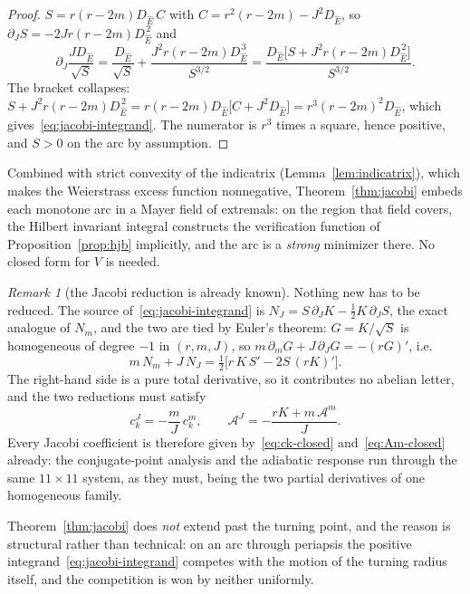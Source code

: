 \documentclass[12pt]{iopart}
\newcommand{\Ehat}{\hat E}
\theoremstyle{plain}
\theoremstyle{definition}
\theoremstyle{plain}
\theoremstyle{remark}
\newtheorem*{remark}{Remark}
\begin{document}
\begin{proof}
$S=r(r-2m)D_{\Ehat}\,C$ with $C=r^2(r-2m)-J^2D_{\Ehat}$, so
$\partial_JS=-2Jr(r-2m)D_{\Ehat}^{\,2}$ and
\[
   \partial_J\frac{JD_{\Ehat}}{\sqrt S}
   =\frac{D_{\Ehat}}{\sqrt S}+\frac{J^2r(r-2m)D_{\Ehat}^{\,3}}{S^{3/2}}
   =\frac{D_{\Ehat}\big[S+J^2r(r-2m)D_{\Ehat}^{\,2}\big]}{S^{3/2}} .
\]
The bracket collapses: $S+J^2r(r-2m)D_{\Ehat}^{\,2}
=r(r-2m)D_{\Ehat}\big[C+J^2D_{\Ehat}\big]=r^3(r-2m)^2D_{\Ehat}$, which
gives~\eqref{eq:jacobi-integrand}. The numerator is $r^3$ times a square, hence positive,
and $S>0$ on the arc by assumption.
\end{proof}

Combined with strict convexity of the indicatrix (Lemma~\ref{lem:indicatrix}), which makes
the Weierstrass excess function nonnegative, Theorem~\ref{thm:jacobi} embeds each monotone
arc in a Mayer field of extremals: on the region that field covers, the Hilbert invariant
integral constructs the verification function of Proposition~\ref{prop:hjb} implicitly, and
the arc is a \emph{strong} minimizer there. No closed form for $V$ is needed.

\begin{remark}[the Jacobi reduction is already known]\label{rem:jacobi-euler}
Nothing new has to be reduced. The source of~\eqref{eq:jacobi-integrand} is
$N_J=S\,\partial_JK-\tfrac12K\,\partial_JS$, the exact analogue of $N_m$, and the two are
tied by Euler's theorem: $G=K/\sqrt S$ is homogeneous of degree $-1$ in $(r,m,J)$, so
$m\,\partial_mG+J\,\partial_JG=-(rG)'$, i.e.
\begin{equation}
   m\,N_m+J\,N_J=\tfrac12\big[r\,K\,S'-2S\,(rK)'\big].
   \label{eq:jacobi-euler}
\end{equation}
The right-hand side is a pure total derivative, so it contributes no abelian letter, and
the two reductions must satisfy
\begin{equation}
   c^J_k=-\frac{m}{J}\,c^m_k,\qquad
   \mathcal{A}^J=-\frac{rK+m\,\mathcal{A}^m}{J} .
   \label{eq:jacobi-coeffs}
\end{equation}
Every Jacobi coefficient is therefore given by~\eqref{eq:ck-closed}
and~\eqref{eq:Am-closed} already: the conjugate-point analysis and the adiabatic response
run through the same $11\times11$ system, as they must, being the two partial derivatives
of one homogeneous family.
\end{remark}

Theorem~\ref{thm:jacobi} does \emph{not} extend past the turning point, and the reason is
structural rather than technical: on an arc through periapsis the positive
integrand~\eqref{eq:jacobi-integrand} competes with the motion of the turning radius
itself, and the competition is won by neither uniformly.
\end{document}
